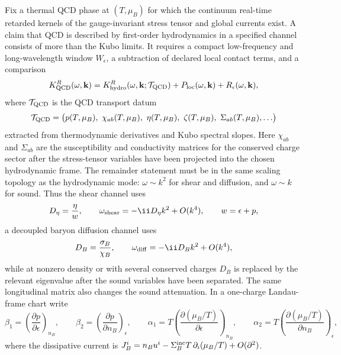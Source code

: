 \begin{controlledapproximation}
\label{ca:qcd-hydrodynamic-response-window}
Fix a thermal QCD phase at \((T,\mu_B)\) for which the continuum real-time
retarded kernels of the gauge-invariant stress tensor and global currents
exist.  A claim that QCD is described by first-order hydrodynamics in a
specified channel consists of more than the Kubo limits.  It requires a
compact low-frequency and long-wavelength window \(W_\epsilon\), a subtraction
of declared local contact terms, and a comparison
\begin{equation}
  K^R_{\rm QCD}(\omega,\mathbf k)
  =
  K^R_{\rm hydro}(\omega,\mathbf k;\mathcal T_{\rm QCD})
  +
  P_{\rm loc}(\omega,\mathbf k)
  +
  R_\epsilon(\omega,\mathbf k),
  \label{eq:qcd-hydro-response-comparison}
\end{equation}
where \(\mathcal T_{\rm QCD}\) is the QCD transport datum
\[
  \mathcal T_{\rm QCD}
  =
  \bigl(
    p(T,\mu_B),\ \chi_{ab}(T,\mu_B),\
    \eta(T,\mu_B),\ \zeta(T,\mu_B),\ \Sigma_{ab}(T,\mu_B),\ldots
  \bigr)
\]
extracted from thermodynamic derivatives and Kubo spectral slopes.  Here
\(\chi_{ab}\) and \(\Sigma_{ab}\) are the susceptibility and conductivity
matrices for the conserved charge sector after the stress-tensor variables
have been projected into the chosen hydrodynamic frame.  The remainder
statement must be in the same scaling topology as the hydrodynamic mode:
\(\omega\sim k^2\) for shear and diffusion, and \(\omega\sim k\) for sound.
Thus the shear channel uses
\[
  D_\eta=\frac{\eta}{w},
  \qquad
  \omega_{\rm shear}=-\ii D_\eta k^2+O(k^4),
  \qquad
  w=\epsilon+p,
\]
a decoupled baryon diffusion channel uses
\[
  D_B=\frac{\sigma_B}{\chi_B},
  \qquad
  \omega_{\rm diff}=-\ii D_B k^2+O(k^4),
\]
while at nonzero density or with several conserved charges \(D_B\) is replaced
by the relevant eigenvalue after the sound variables have been separated.  The
same longitudinal matrix also changes the sound attenuation.  In a one-charge
Landau-frame chart write
\begin{equation}
  \beta_1=\left(\frac{\partial p}{\partial\epsilon}\right)_{n_B},
  \qquad
  \beta_2=\left(\frac{\partial p}{\partial n_B}\right)_{\epsilon},
  \qquad
  \alpha_1=T\left(\frac{\partial(\mu_B/T)}{\partial\epsilon}\right)_{n_B},
  \qquad
  \alpha_2=T\left(\frac{\partial(\mu_B/T)}{\partial n_B}\right)_{\epsilon},
  \label{eq:qcd-charged-sound-thermodynamic-derivatives}
\end{equation}
where the dissipative current is
\(J_B^i=n_Bu^i-\Sigma_B^{\rm inc}T\,\partial_i(\mu_B/T)+O(\partial^2)\).

\end{controlledapproximation}
